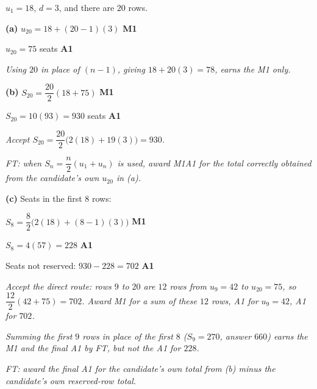 \documentclass[12pt, twoside]{article}
\begin{document}
\begin{enumerate}[itemsep=0.3cm]
$u_{1} = 18$, $d = 3$, and there are $20$ rows.

\medskip

\textbf{(a)} $u_{20} = 18 + (20 - 1)(3)$ \hfill \textbf{M1}

$u_{20} = 75$ seats \hfill \textbf{A1}

\emph{Using $20$ in place of $(n - 1)$, giving $18 + 20(3) = 78$, earns
the M1 only.}

\medskip

\textbf{(b)} $S_{20} = \dfrac{20}{2}(18 + 75)$ \hfill \textbf{M1}

$S_{20} = 10(93) = 930$ seats \hfill \textbf{A1}

\emph{Accept $S_{20} = \dfrac{20}{2}\bigl(2(18) + 19(3)\bigr) = 930$.}

\emph{FT: when $S_{n} = \dfrac{n}{2}(u_{1} + u_{n})$ is used, award M1A1
for the total correctly obtained from the candidate's own $u_{20}$ in (a).}

\medskip

\textbf{(c)} Seats in the first $8$ rows:

$S_{8} = \dfrac{8}{2}\bigl(2(18) + (8 - 1)(3)\bigr)$ \hfill \textbf{M1}

$S_{8} = 4(57) = 228$ \hfill \textbf{A1}

Seats not reserved: $930 - 228 = 702$ \hfill \textbf{A1}

\emph{Accept the direct route: rows $9$ to $20$ are $12$ rows from
$u_{9} = 42$ to $u_{20} = 75$, so $\dfrac{12}{2}(42 + 75) = 702$. Award M1
for a sum of these $12$ rows, A1 for $u_{9} = 42$, A1 for $702$.}

\emph{Summing the first $9$ rows in place of the first $8$
($S_{9} = 270$, answer $660$) earns the M1 and the final A1 by FT, but not
the A1 for $228$.}

\emph{FT: award the final A1 for the candidate's own total from (b) minus
the candidate's own reserved-row total.}

\end{enumerate}
\end{document}
